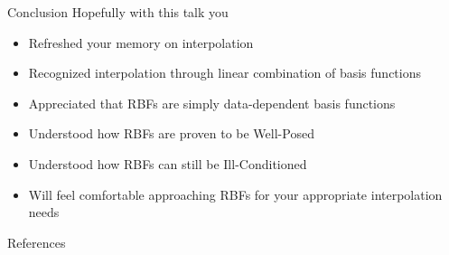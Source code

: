 \documentclass[12pt,t]{beamer}
\newcommand{\bi}{\begin{itemize}}
\newcommand{\ei}{\end{itemize}}
\begin{document}
\begin{frame}{Conclusion}
Hopefully with this talk you

\bi
\item Refreshed your memory on interpolation
\item Recognized interpolation through linear combination of basis functions
\item Appreciated that RBFs are simply data-dependent basis functions
\item Understood how RBFs are proven to be Well-Posed
\item Understood how RBFs can still be Ill-Conditioned
\item Will feel comfortable approaching RBFs for your appropriate interpolation needs
\ei

\note{}
\end{frame}

\begin{frame}[c]{References}
\nocite{Wright2003,Fasshauer2012,Mongillo2011,Buhmann2003}



\note{}
\end{frame}
\end{document}
